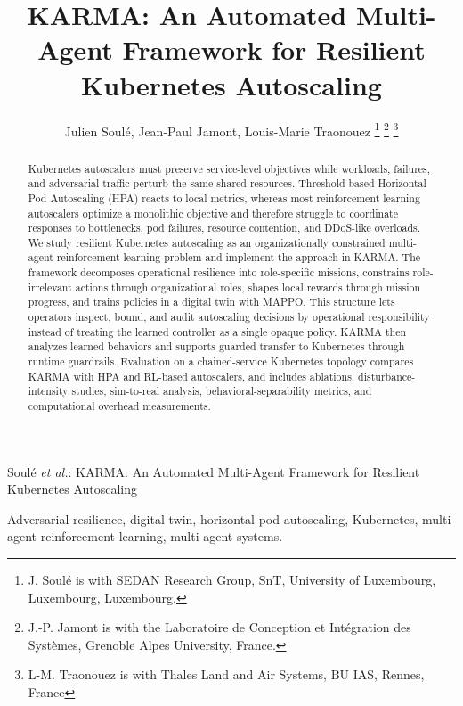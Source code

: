 \documentclass[journal]{IEEEtran}
\begin{document}
\title{KARMA: An Automated Multi-Agent Framework for Resilient Kubernetes Autoscaling}

\author{Julien Soulé, Jean-Paul Jamont, Louis-Marie Traonouez%
  \thanks{J. Soulé is with SEDAN Research Group, SnT, University of Luxembourg, Luxembourg, Luxembourg.}%
  \thanks{J.-P. Jamont is with the Laboratoire de Conception et Intégration des Systèmes, Grenoble Alpes University, France.}
  \thanks{L-M. Traonouez is with Thales Land and Air Systems, BU IAS, Rennes,  France}}

%
{Soulé \MakeLowercase{\textit{et al.}}: KARMA: An Automated Multi-Agent Framework for Resilient Kubernetes Autoscaling}

\maketitle

\begin{abstract}
  Kubernetes autoscalers must preserve service-level objectives while workloads, failures, and adversarial traffic perturb the same shared resources. Threshold-based Horizontal Pod Autoscaling (HPA) reacts to local metrics, whereas most reinforcement learning autoscalers optimize a monolithic objective and therefore struggle to coordinate responses to bottlenecks, pod failures, resource contention, and DDoS-like overloads. We study resilient Kubernetes autoscaling as an organizationally constrained multi-agent reinforcement learning problem and implement the approach in KARMA. The framework decomposes operational resilience into role-specific missions, constrains role-irrelevant actions through organizational roles, shapes local rewards through mission progress, and trains policies in a digital twin with MAPPO. This structure lets operators inspect, bound, and audit autoscaling decisions by operational responsibility instead of treating the learned controller as a single opaque policy. KARMA then analyzes learned behaviors and supports guarded transfer to Kubernetes through runtime guardrails. Evaluation on a chained-service Kubernetes topology compares KARMA with HPA and RL-based autoscalers, and includes ablations, disturbance-intensity studies, sim-to-real analysis, behavioral-separability metrics, and computational overhead measurements.
\end{abstract}

\begin{IEEEkeywords}
  Adversarial resilience, digital twin, horizontal pod autoscaling, Kubernetes, multi-agent reinforcement learning, multi-agent systems.
\end{IEEEkeywords}
\end{document}
